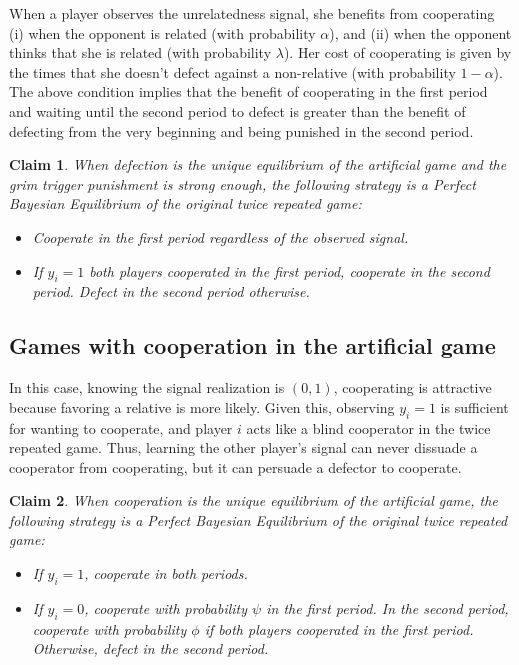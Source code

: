 \documentclass[12pt]{article}
\newtheorem{claim}{Claim}
\begin{document}
When a player observes the unrelatedness signal, she benefits from cooperating (i) when the opponent is related (with probability $\alpha$), and (ii) when the opponent thinks that she is related (with probability $\lambda$). Her cost of cooperating is given by the times that she doesn't defect against a non-relative (with probability $1-\alpha$). The above condition implies that the benefit of cooperating in the first period and waiting until the second period to defect is greater than the benefit of defecting from the very beginning and being punished in the second period.

\begin{claim} \label{defection}
When defection is the unique equilibrium of the artificial game and the grim trigger punishment is strong enough, 
the following strategy is a Perfect Bayesian Equilibrium of the original twice repeated game:
\begin{itemize}
    \item{Cooperate in the first period regardless of the observed signal.}
    \item{If $y_{i}=1$ both players cooperated in the first period, cooperate in the second period.
    Defect in the second period otherwise.}
\end{itemize}
\end{claim}


\subsection{Games with cooperation in the artificial game}\label{coop_ag}

In this case, knowing the signal realization is $(0,1)$, cooperating is attractive because favoring a relative is more likely. Given this, observing $y_{i}=1$ is sufficient for wanting to cooperate, and player $i$ acts like a blind cooperator in the twice repeated game. Thus, learning the other player's signal can never dissuade a cooperator from cooperating, but it can persuade a defector to cooperate.

\begin{claim} \label{cooperation}
When cooperation is the unique equilibrium of the artificial game, 
the following strategy is a Perfect Bayesian Equilibrium of the original twice repeated game:

\begin{itemize}
    \item{If $y_{i}=1$, cooperate in both periods.}
    \item{If $y_{i}=0$, cooperate with probability $\psi$ in the first period. In the second period, cooperate with probability $\phi$ if both players cooperated in the first period. Otherwise, defect in the second period.}
\end{itemize}
\end{claim}
\end{document}
